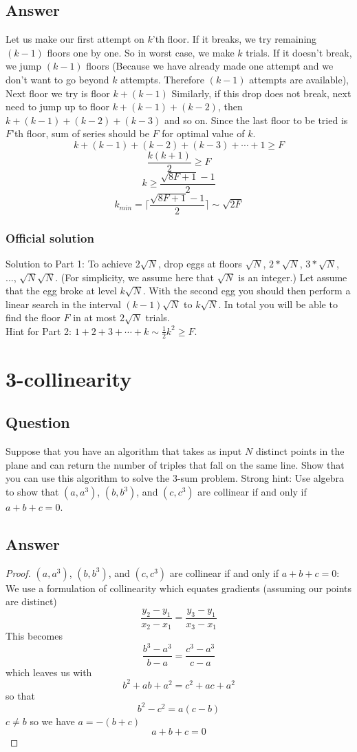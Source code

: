 \documentclass[12pt]{article}
\numberwithin{equation}{section}
\begin{document}
\subsection*{Answer}
Let us make our first attempt on $k$'th floor.
If it breaks, we try remaining $(k-1)$ floors one by one. 
So in worst case, we make $k$ trials.
If it doesn’t break, we jump $(k-1)$ floors (Because we have
already made one attempt and we don't want to go beyond 
$k$ attempts. Therefore $(k-1)$ attempts are available),
Next floor we try is floor $k + (k-1)$
Similarly, if this drop does not break, next need to jump 
up to floor $k + (k-1) + (k-2)$, then $k + (k-1) + (k-2) + (k-3)$
and so on.
Since the last floor to be tried is $F$'th floor, sum of
series should be $F$ for optimal value of $k$.
\[k + (k-1) + (k-2) + (k-3) + \cdots + 1 \geqslant F\]
\[\frac{k(k+1)}{2} \geqslant F\]
\[k \geqslant \frac{\sqrt{8F+1}-1}{2}\]
\[k_{min} = \lceil \frac{\sqrt{8F+1}-1}{2} \rceil \sim \sqrt{2F}\] 
\subsubsection*{Official solution}
Solution to Part 1: To achieve $2\sqrt{N}$, drop eggs at floors $\sqrt{N}$,
$2*\sqrt{N}$, $3*\sqrt{N}$, ..., $\sqrt{N}\sqrt{N}$. (For simplicity, we assume
here that $\sqrt{N}$ is an integer.) Let assume that the egg broke at level
$k\sqrt{N}$. With the second egg you should then perform a linear search in the
interval $(k-1)\sqrt{N}$ to $k\sqrt{N}$. In total you will be able to find the
floor $F$ in at most $2\sqrt{N}$ trials.\\
Hint for Part 2: $1 + 2 + 3 + \cdots + k \sim \frac{1}{2}k^2 \geqslant F$. 

\newpage
\section{3-collinearity}
\subsection*{Question}
Suppose that you have an algorithm that takes as input $N$ distinct
points in the plane and can return the number of triples that fall on the same line.
Show that you can use this algorithm to solve the 3-sum problem. Strong hint: Use
algebra to show that $(a, a^3)$, $(b, b^3)$, and $(c, c^3)$ are collinear if and only if $a + b + c = 0$.
\subsection*{Answer}
\begin{proof}
    $(a, a^3)$, $(b, b^3)$, and $(c, c^3)$ are collinear if and only if $a + b + c = 0$: \\
    We use a formulation of collinearity which equates gradients (assuming our points are distinct) 
    \[\frac{y_2-y_1}{x_2-x_1}=\frac{y_3-y_1}{x_3-x_1}\]
    This becomes
    \[\frac{b^3-a^3}{b-a}=\frac{c^3-a^3}{c-a}\]
    which leaves us with
    \[b^2+ab+a^2=c^2+ac+a^2\]
    so that
    \[b^2-c^2=a(c-b)\]
    $c \neq b$ so we have $a=-(b+c)$
    \[a+b+c=0\]
\end{proof}
\end{document}
